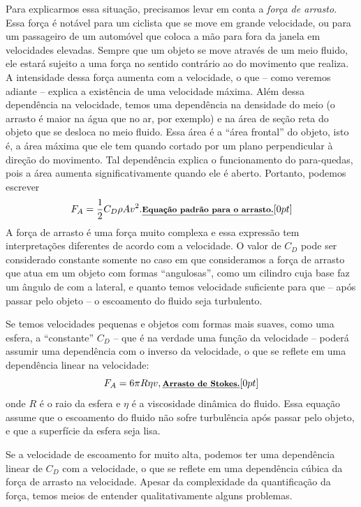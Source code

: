 Para explicarmos essa situação, precisamos levar em conta a \emph{força de arrasto}. Essa força é notável para um ciclista que se move em grande velocidade, ou para um passageiro de um automóvel que coloca a mão para fora da janela em velocidades elevadas. Sempre que um objeto se move através de um meio fluido, ele estará sujeito a uma força no sentido contrário ao do movimento que realiza. A intensidade dessa força aumenta com a velocidade, o que -- como veremos adiante -- explica a existência de uma velocidade máxima. Além dessa dependência na velocidade, temos uma dependência na densidade do meio (o arrasto é maior na água que no ar, por exemplo) e na área de seção reta do objeto que se desloca no meio fluido. Essa área é a ``área frontal'' do objeto, isto é, a área máxima que ele tem quando cortado por um plano perpendicular à direção do movimento. Tal dependência explica o funcionamento do para-quedas, pois a área aumenta significativamente quando ele é aberto. Portanto, podemos escrever
\begin{equation}\label{Eq:ExpPadraoArrasto}
  F_A = \frac{1}{2}C_D \rho A v^2. \relax{\footnotesize\emph{\textbf{Equação padrão para o arrasto.}}}[0pt]
\end{equation}
%
 A força de arrasto é uma força muito complexa e essa expressão tem interpretações diferentes de acordo com a velocidade. O valor de $C_D$ pode ser considerado constante somente no caso em que consideramos a força de arrasto que atua em um objeto com formas ``angulosas'', como um cilindro cuja base faz um ângulo de  com a lateral, e quanto temos velocidade suficiente para que -- após passar pelo objeto -- o escoamento do fluido seja turbulento. 
 
Se temos velocidades pequenas e objetos com formas mais suaves,  como uma esfera, a ``constante'' $C_D$ -- que é na verdade uma função da velocidade -- poderá assumir uma dependência com o inverso da velocidade, o que se reflete em uma dependência linear na velocidade:
\begin{equation}
  F_A = 6 \pi R \eta v, \relax{\footnotesize\emph{\textbf{Arrasto de Stokes.}}}[0pt]
\end{equation}
%
onde $R$ é o raio da esfera e $\eta$ é a viscosidade dinâmica do fluido. Essa equação assume que o escoamento do fluido não sofre turbulência após passar pelo objeto, e que a superfície da esfera seja lisa.

Se a velocidade de escoamento for muito alta, podemos ter uma dependência linear de $C_D$ com a velocidade, o que se reflete em uma dependência cúbica da força de arrasto na velocidade. Apesar da complexidade da quantificação da força, temos meios de entender qualitativamente alguns problemas.

